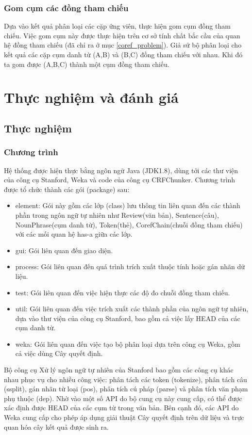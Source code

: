 \documentclass[12pt]{report}
\begin{document}
			\subsection*{Gom cụm các đồng tham chiếu}	
				\par Dựa vào kết quả phân loại các cặp ứng viên, thực hiện gom cụm đồng tham chiếu. Việc gom cụm này được thực hiện trên cơ sở tính chất bắc cầu của quan hệ đồng tham chiếu (đã chỉ ra ở mục \ref{coref_problem}). Giả sử bộ phân loại cho kết quả các cặp cụm danh từ (A,B) và (B,C) đồng tham chiếu với nhau. Khi đó ta gom được (A,B,C) thành một cụm đồng tham chiếu.	

	\chapter{Thực nghiệm và đánh giá}						
		\section{Thực nghiệm}
			\subsection*{Chương trình}
				\par Hệ thống được hiện thực bằng ngôn ngữ Java (JDK1.8), dùng tới các thư viện của công cụ Stanford, Weka và code của công cụ CRFChunker. Chương trình được tổ chức thành các gói (package) sau:
				\begin{itemize}
					\item{element: Gói này gồm các lớp (class) lưu thông tin liên quan đến các thành phần trong ngôn ngữ tự nhiên như Review(văn bản), Sentence(câu), NounPhrase(cụm danh từ), Token(thẻ), CorefChain(chuỗi đồng tham chiếu) với các mối quan hệ has-a giữa các lớp.}
					\item{gui: Gói liên quan đến giao diện.}
					\item{process: Gói liên quan đến quá trình trích xuất thuộc tính hoặc gán nhãn dữ liệu.}
					\item{test: Gói liên quan đến việc hiện thực các độ đo chuỗi đồng tham chiếu.}
					\item{util: Gói liên quan đến việc trích xuất các thành phần của ngôn ngữ tự nhiên, dựa vào thư viện của công cụ Stanford, bao gồm cả việc lấy HEAD của các cụm danh từ.}
					\item{weka: Gói liên quan đến việc tạo bộ phân loại dựa trên công cụ Weka, gồm cả việc dùng Cây quyết định.}
				\end{itemize}
				\par Bộ công cụ Xử lý ngôn ngữ tự nhiên của Stanford bao gồm các công cụ khác nhau phục vụ cho nhiều công việc: phân tách các token (tokenize), phân tách câu (ssplit), gán nhãn từ loại (pos), phân tích cú pháp (parse) và phân tích văn phạm phụ thuộc (dep). Nhờ vào một số API do bộ cung cụ này cung cấp, có thể được xác định được HEAD của các cụm từ trong văn bản. Bên cạnh đó, các API do Weka cung cấp cho phép áp dụng giải thuật Cây quyết định trên dữ liệu và trực quan hóa cây kết quả được sinh ra. 
\end{document}
